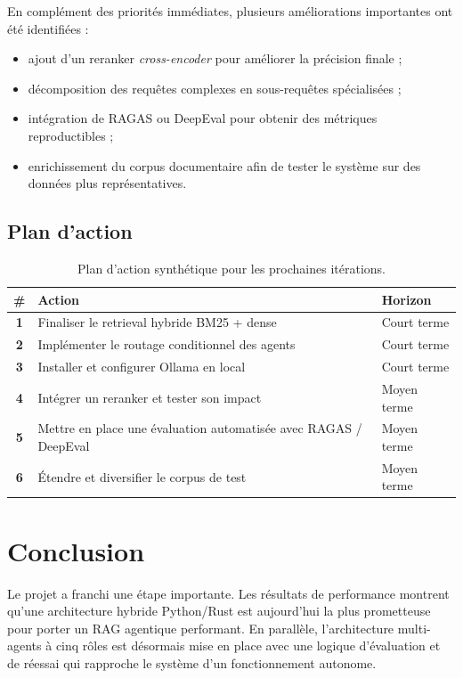 \documentclass[12pt,a4paper]{report}
\begin{document}
En complément des priorités immédiates, plusieurs améliorations importantes ont été identifiées :

\begin{itemize}[leftmargin=1.2cm]
  \item ajout d'un reranker \textit{cross-encoder} pour améliorer la précision finale ;
  \item décomposition des requêtes complexes en sous-requêtes spécialisées ;
  \item intégration de RAGAS ou DeepEval pour obtenir des métriques reproductibles ;
  \item enrichissement du corpus documentaire afin de tester le système sur des données plus représentatives.
\end{itemize}

\section{Plan d'action}

\begin{table}[H]
  \centering
  \renewcommand{\arraystretch}{1.25}
  \begin{tabular}{>{\bfseries}c p{9cm} l}
    \toprule
    \# & Action & Horizon \\
    \midrule
    1 & Finaliser le retrieval hybride BM25 + dense & Court terme \\
    2 & Implémenter le routage conditionnel des agents & Court terme \\
    3 & Installer et configurer Ollama en local & Court terme \\
    4 & Intégrer un reranker et tester son impact & Moyen terme \\
    5 & Mettre en place une évaluation automatisée avec RAGAS / DeepEval & Moyen terme \\
    6 & Étendre et diversifier le corpus de test & Moyen terme \\
    \bottomrule
  \end{tabular}
  \caption{Plan d'action synthétique pour les prochaines itérations.}
\end{table}

\chapter{Conclusion}

Le projet a franchi une étape importante. Les résultats de performance montrent qu'une architecture hybride Python/Rust est aujourd'hui la plus prometteuse pour porter un RAG agentique performant. En parallèle, l'architecture multi-agents à cinq rôles est désormais mise en place avec une logique d'évaluation et de réessai qui rapproche le système d'un fonctionnement autonome.
\end{document}
